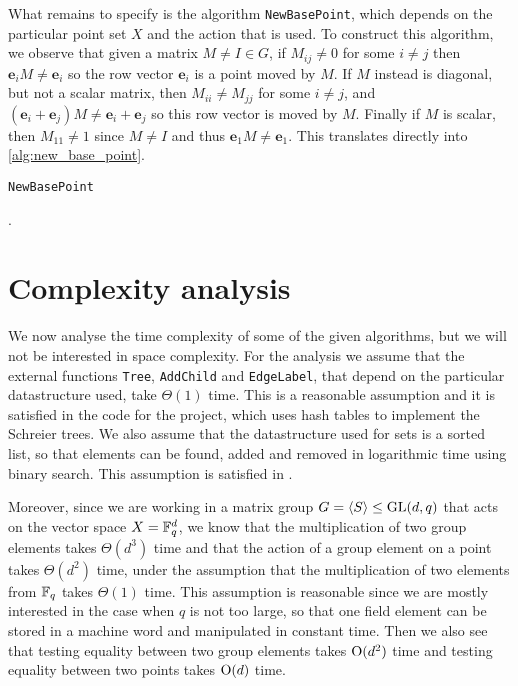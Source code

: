 What remains to specify is the algorithm \texttt{NewBasePoint}, which
depends on the particular point set $X$ and the action that is used.
To construct this algorithm, we observe that given a matrix $M \neq I
\in G$, if $M_{ij} \neq 0$ for some $i \neq j$ then $\mathbf{e}_i M \neq \mathbf{e}_i$
so the row vector $\mathbf{e}_i$ is a point moved by $M$. If $M$ instead is
diagonal, but not a scalar matrix, then $M_{ii} \neq M_{jj}$ for some
$i \neq j$, and $(\mathbf{e}_i + \mathbf{e}_j) M \neq \mathbf{e}_i + \mathbf{e}_j$ so this row vector is
moved by $M$. Finally if $M$ is scalar, then $M_{11} \neq 1$ since $M
\neq I$ and thus $\mathbf{e}_1 M \neq \mathbf{e}_1$. This translates directly into \ref{alg:new_base_point}.

\begin{algorithm} 
\dontprintsemicolon
\caption{\texttt{NewBasePoint}}
.
\Begin
{
  {
    {
      {
      }
    }
  }
  {
    {
      {
      }
    }
  }
}
\label{alg:new_base_point}
\end{algorithm}

\section{Complexity analysis}
We now analyse the time complexity of some of the given algorithms, but we
will not be interested in space complexity. For the analysis we assume
that the external functions \texttt{Tree}, \texttt{AddChild} and
\texttt{EdgeLabel}, that depend on the particular datastructure used,
take $\Theta(1)$ time. This is a reasonable assumption and it is satisfied
in the code for the project, which uses hash tables to implement the Schreier trees. We also assume that the datastructure
used for sets is a sorted list, so that elements can be found, added and
removed in logarithmic time using binary search. This assumption is
satisfied in \GAP.

Moreover, since we are working in a matrix group $G = \left\langle S \right\rangle \leq
\operatorname{GL}(d, q)$ that acts on the vector space $X = \mathbb{F}_q^d$, we know that
the multiplication of two group elements takes $\Theta(d^3)$ time and
that the action of a group element on a point takes 
$\Theta(d^2)$ time, under the assumption that the multiplication of two
elements from $\mathbb{F}_q$ takes $\Theta(1)$ time. This assumption is
reasonable since we are mostly interested in the case when $q$ is not too large, so that one field element can be stored in a machine word and manipulated in constant time. Then
we also see that testing equality between two group elements takes
$\operatorname{O} ( d^2 )$ time and testing equality between two points takes 
$\operatorname{O} ( d )$ time.

